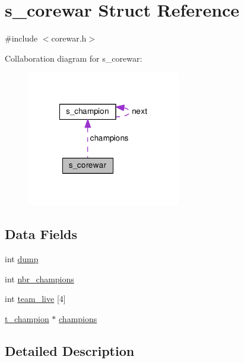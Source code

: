 \hypertarget{structs__corewar}{\section{s\-\_\-corewar Struct Reference}
\label{structs__corewar}
}


{\ttfamily \#include $<$corewar.\-h$>$}



Collaboration diagram for s\-\_\-corewar\-:\nopagebreak
\begin{figure}[H]
\begin{center}
\leavevmode
\includegraphics[width=190pt]{d6/d3e/structs__corewar__coll__graph}
\end{center}
\end{figure}
\subsection*{Data Fields}
\begin{DoxyCompactItemize}
\item 
int \hyperlink{structs__corewar_a28773f3c282d16757e3a3e1027825a17}{dump}
\item 
int \hyperlink{structs__corewar_aa5715503159a366aea104fae729231db}{nbr\-\_\-champions}
\item 
int \hyperlink{structs__corewar_ab318b23ba3b1ec05a71a3edb155255d6}{team\-\_\-live} \mbox{[}4\mbox{]}
\item 
\hyperlink{champion_8h_af3f9163944df13e54db0e86e23ad7384}{t\-\_\-champion} $\ast$ \hyperlink{structs__corewar_a2d2d5697f388905b044f2cde1f481d2d}{champions}
\end{DoxyCompactItemize}


\subsection{Detailed Description}


